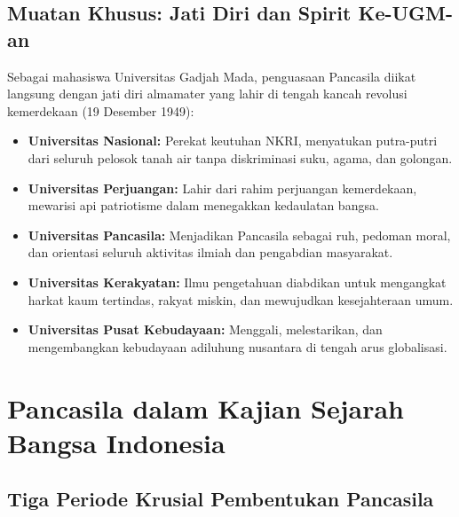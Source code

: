 \documentclass[10pt,a4paper]{article}
\begin{document}
\subsection{Muatan Khusus: Jati Diri dan Spirit Ke-UGM-an}
Sebagai mahasiswa Universitas Gadjah Mada, penguasaan Pancasila diikat langsung dengan jati diri almamater yang lahir di tengah kancah revolusi kemerdekaan (19 Desember 1949):
\begin{conceptbox}
\begin{itemize}
  \item \textbf{Universitas Nasional:} Perekat keutuhan NKRI, menyatukan putra-putri dari seluruh pelosok tanah air tanpa diskriminasi suku, agama, dan golongan.
  \item \textbf{Universitas Perjuangan:} Lahir dari rahim perjuangan kemerdekaan, mewarisi api patriotisme dalam menegakkan kedaulatan bangsa.
  \item \textbf{Universitas Pancasila:} Menjadikan Pancasila sebagai ruh, pedoman moral, dan orientasi seluruh aktivitas ilmiah dan pengabdian masyarakat.
  \item \textbf{Universitas Kerakyatan:} Ilmu pengetahuan diabdikan untuk mengangkat harkat kaum tertindas, rakyat miskin, dan mewujudkan kesejahteraan umum.
  \item \textbf{Universitas Pusat Kebudayaan:} Menggali, melestarikan, dan mengembangkan kebudayaan adiluhung nusantara di tengah arus globalisasi.
\end{itemize}
\end{conceptbox}

\section{Pancasila dalam Kajian Sejarah Bangsa Indonesia}

\subsection{Tiga Periode Krusial Pembentukan Pancasila}
\end{document}
